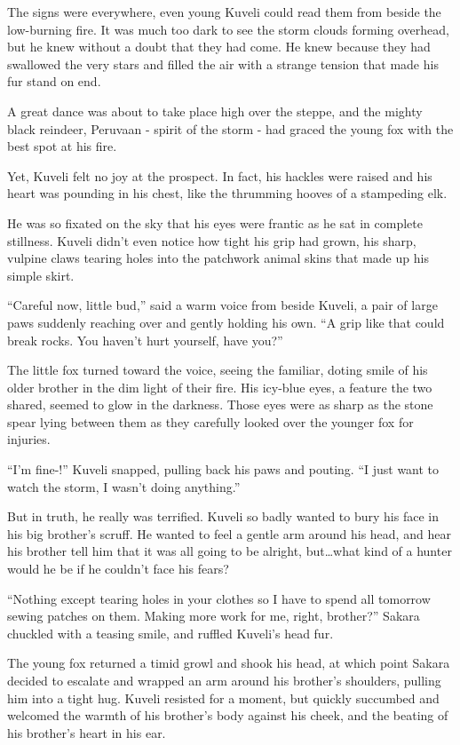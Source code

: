 The signs were everywhere, even young Kuveli could read them from beside the low-burning fire. It was much too dark to see the storm clouds forming overhead, but he knew without a doubt that they had come. He knew because they had swallowed the very stars and filled the air with a strange tension that made his fur stand on end.

A great dance was about to take place high over the steppe, and the mighty black reindeer, Peruvaan - spirit of the storm - had graced the young fox with the best spot at his fire.

Yet, Kuveli felt no joy at the prospect. In fact, his hackles were raised and his heart was pounding in his chest, like the thrumming hooves of a stampeding elk.

He was so fixated on the sky that his eyes were frantic as he sat in complete stillness. Kuveli didn't even notice how tight his grip had grown, his sharp, vulpine claws tearing holes into the patchwork animal skins that made up his simple skirt.

``Careful now, little bud,'' said a warm voice from beside Kuveli, a pair of large paws suddenly reaching over and gently holding his own. ``A grip like that could break rocks. You haven't hurt yourself, have you?''

The little fox turned toward the voice, seeing the familiar, doting smile of his older brother in the dim light of their fire. His icy-blue eyes, a feature the two shared, seemed to glow in the darkness. Those eyes were as sharp as the stone spear lying between them as they carefully looked over the younger fox for injuries.

``I'm fine-!'' Kuveli snapped, pulling back his paws and pouting. ``I just want to watch the storm, I wasn't doing anything.''

But in truth, he really was terrified. Kuveli so badly wanted to bury his face in his big brother's scruff. He wanted to feel a gentle arm around his head, and hear his brother tell him that it was all going to be alright, but\ldots{}what kind of a hunter would he be if he couldn't face his fears?

``Nothing except tearing holes in your clothes so I have to spend all tomorrow sewing patches on them. Making more work for me, right, brother?'' Sakara chuckled with a teasing smile, and ruffled Kuveli's head fur.

The young fox returned a timid growl and shook his head, at which point Sakara decided to escalate and wrapped an arm around his brother's shoulders, pulling him into a tight hug. Kuveli resisted for a moment, but quickly succumbed and welcomed the warmth of his brother's body against his cheek, and the beating of his brother's heart in his ear.

